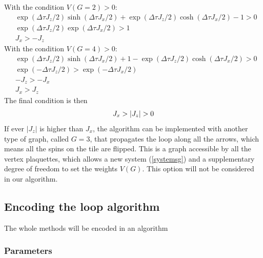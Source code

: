 \documentclass[a4paper,12pt]{article}
\begin{document}
	With the condition $V(G=2) > 0$:
	\begin{equation}
		\begin{split}
		&\exp(\Delta \tau J_{z}/2)\sinh(\Delta\tau J_{x}/2) + \exp(\Delta \tau J_{z}/2)\cosh(\Delta\tau J_{x}/2) - 1  > 0 \\
		&\exp(\Delta \tau J_{z}/2)\exp(\Delta\tau J_{x}/2)  > 1\\
		&J_{x} > - J_{z}
		\end{split}
	\end{equation}
	With the condition $V(G=4) > 0$:
	\begin{equation}
		\begin{split}
		&\exp(\Delta \tau J_{z}/2)\sinh(\Delta\tau J_{x}/2) + 1 - \exp(\Delta \tau J_{z}/2)\cosh(\Delta\tau J_{x}/2) > 0 \\
		&\exp(- \Delta \tau J_{z}/2)  > \exp(- \Delta\tau J_{x}/2)\\
		&- J_{z} > - J_{x}\\
		& J_{x} > J_{z}
		\end{split}
	\end{equation}
	The final condition is then
	\begin{equation}
		\centering
		J_{x} > |J_{z}| > 0
	\end{equation}
	If ever $|J_{z}|$ is higher than $J_{x}$, the algorithm can be implemented with another type of graph, called $G = 3$, that propagates the loop along all the arrows, which means all the spins on the tile are flipped. This is a graph accessible by all the vertex plaquettes, which allows a new system (\ref{systemsg}) and a supplementary degree of freedom to set the weights $V(G)$. This option will not be considered in our algorithm.
	
	\subsection{Encoding the loop algorithm}
	The whole methods will be encoded in an algorithm
	
	\subsubsection{Parameters}
	
\end{document}
